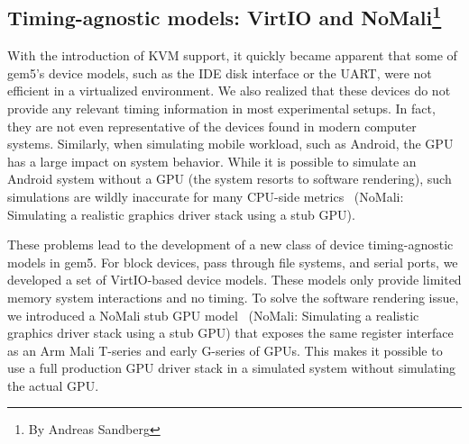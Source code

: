 \subsection[Timing-agnostic models: VirtIO and NoMali]{Timing-agnostic models: VirtIO and NoMali\footnote{By Andreas Sandberg}}

With the introduction of KVM support, it quickly became apparent that some of gem5’s device models, such as the IDE disk interface or the UART, were not efficient in a virtualized environment.
We also realized that these devices do not provide any relevant timing information in most experimental setups.
In fact, they are not even representative of the devices found in modern computer systems.
Similarly, when simulating mobile workload, such as Android, the GPU has a large impact on system behavior.
While it is possible to simulate an Android system without a GPU (the system resorts to software rendering), such simulations are wildly inaccurate for many CPU-side metrics~\cite{} (NoMali: Simulating a realistic graphics driver stack using a stub GPU).

These problems lead to the development of a new class of device timing-agnostic models in gem5.
For block devices, pass through file systems, and serial ports, we developed a set of VirtIO-based device models.
These models only provide limited memory system interactions and no timing. To solve the software rendering issue, we introduced a NoMali stub GPU model~\cite{} (NoMali: Simulating a realistic graphics driver stack using a stub GPU) that exposes the same register interface as an Arm Mali T-series and early G-series of GPUs.
This makes it possible to use a full production GPU driver stack in a simulated system without simulating the actual GPU.

